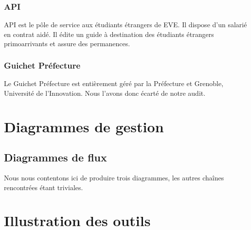 \subsubsection{API}

API est le pôle de service aux étudiants étrangers de EVE.
Il dispose d'un salarié en contrat aidé. Il édite un guide à destination des
étudiants étrangers primoarrivants et assure des permanences.

\subsubsection{Guichet Préfecture}

Le Guichet Préfecture est entièrement géré par la Préfecture et Grenoble, Université de l'Innovation.
Nous l'avons donc écarté de notre audit.

\section{Diagrammes de gestion}

\subsection{Diagrammes de flux}
\label{flux}

Nous nous contentons ici de produire trois diagrammes, les autres chaînes
rencontrées étant triviales.



\section{Illustration des outils}

